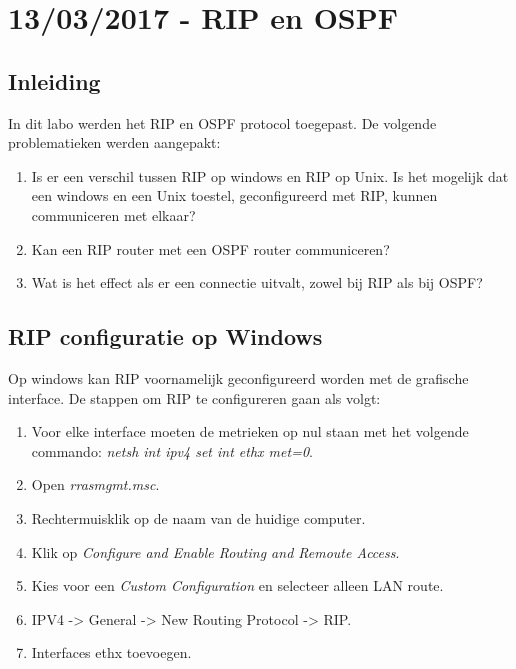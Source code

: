\documentclass{report}
\begin{document}
\chapter{13/03/2017 - RIP en OSPF}
\section{Inleiding}
In dit labo werden het RIP en OSPF protocol toegepast. De volgende problematieken werden aangepakt:
\begin{enumerate}
	\item Is er een verschil tussen RIP op windows en RIP op Unix. Is het mogelijk dat een windows en een Unix toestel, geconfigureerd met RIP, kunnen communiceren met elkaar?
	\item Kan een RIP router met een OSPF router communiceren?
	\item Wat is het effect als er een connectie uitvalt, zowel bij RIP als bij OSPF?
\end{enumerate}

\section{RIP configuratie op Windows}
Op windows kan RIP voornamelijk geconfigureerd worden met de grafische interface. De stappen om RIP te configureren gaan als volgt:

\begin{enumerate}
	\item Voor elke interface moeten de metrieken op nul staan met het volgende commando: \textit{netsh int ipv4 set int ethx met=0}.
	\item Open \textit{rrasmgmt.msc}.
	\item Rechtermuisklik op de naam van de huidige computer.
	\item Klik op \textit{Configure and Enable Routing and Remoute Access}.
	\item Kies voor een \textit{Custom Configuration} en selecteer alleen LAN route.
	\item IPV4 -> General -> New Routing Protocol -> RIP.
	\item Interfaces ethx toevoegen.
\end{enumerate}
\end{document}
